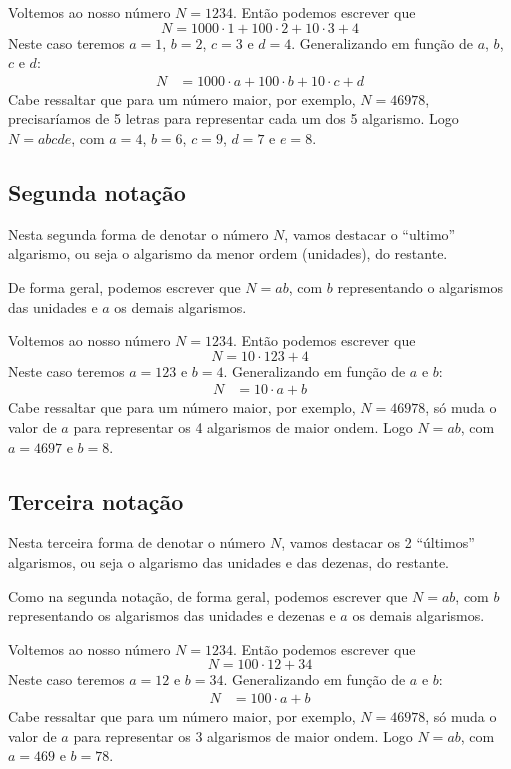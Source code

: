 \documentclass[12pt,a4paper]{article}
\begin{document}
		Voltemos ao nosso número $N = 1234$. Então podemos escrever que
		$$N = 1000 \cdot 1 + 100 \cdot 2 + 10 \cdot 3 + 4$$
		Neste caso teremos $a = 1$, $b = 2$, $c = 3$ e $d = 4$. Generalizando em função de $a$, $b$, $c$ e $d$:		
		\begin{align}
			N &= 1000 \cdot a + 100 \cdot b + 10 \cdot c + d
			\label{eq:not1}
		\end{align}		
		Cabe ressaltar que para um número maior, por exemplo, $N = 46978$, precisaríamos de 5 letras para representar cada um dos 5 algarismo. Logo $N = abcde$, com $a = 4$, $b = 6$, $c = 9$, $d = 7$ e $e = 8$.
		
		\subsection*{Segunda notação}
		
		Nesta segunda forma de denotar o número $N$, vamos destacar o ``ultimo'' algarismo, ou seja o algarismo da menor ordem (unidades), do restante.
		
		De forma geral, podemos escrever que $N = ab$, com $b$ representando o algarismos das unidades e $a$ os demais algarismos. 
		
		Voltemos ao nosso número $N = 1234$. Então podemos escrever que 
		$$N = 10 \cdot 123 + 4$$ 
		Neste caso teremos $a = 123$ e $b = 4$. Generalizando em função de $a$ e $b$:
		\begin{align}
			N &= 10 \cdot a + b
			\label{eq:not2}
		\end{align}		
		Cabe ressaltar que para um número maior, por exemplo, $N = 46978$, só muda o valor de $a$ para representar os 4 algarismos de maior ondem. Logo $N = ab$, com $a = 4697$ e $b = 8$.
		
		\subsection*{Terceira notação}
		
		Nesta terceira forma de denotar o número $N$, vamos destacar os 2 ``últimos'' algarismos, ou seja o algarismo das unidades e das dezenas, do restante.
		
		Como na segunda notação, de forma geral, podemos escrever que $N = ab$, com $b$ representando os algarismos das unidades e dezenas e $a$ os demais algarismos. 
		
		Voltemos ao nosso número $N = 1234$. Então podemos escrever que 		
		$$N = 100 \cdot 12 + 34$$ 		
		Neste caso teremos $a = 12$ e $b = 34$. Generalizando em função de $a$ e $b$:		
		\begin{align}
			N &= 100 \cdot a + b
			\label{eq:not3}
		\end{align}		
		Cabe ressaltar que para um número maior, por exemplo, $N = 46978$, só muda o valor de $a$ para representar os 3 algarismos de maior ondem. Logo $N = ab$, com $a = 469$ e $b = 78$.
		
\end{document}

